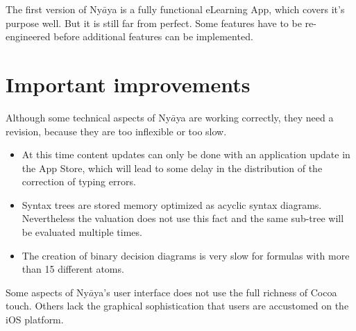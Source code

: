 
The first version of Ny$\bar{a}$ya is a fully functional eLearning App, 
which covers it’s purpose well.
But it is still far from perfect.
Some features have to be re-engineered before additional features can be implemented.

\section{Important improvements}

Although some technical aspects of Ny$\bar{a}$ya are working correctly, they need a revision, 
because they are too inflexible or too slow.

\begin{itemize}

\item At this time content updates can only be done with an application update in the App Store,
which will lead to some delay in the distribution of the correction of typing errors. 

\item Syntax trees are stored memory optimized as acyclic syntax diagrams. 
Nevertheless the valuation does not use this fact and the same sub-tree will be evaluated multiple times.

\item The creation of binary decision diagrams is very slow for formulas with more than 15 different atoms.

\end{itemize}

Some aspects of Ny$\bar{a}$ya’s user interface does not use the full richness of Cocoa touch. 
Others lack the graphical sophistication that users are accustomed on the iOS platform.

